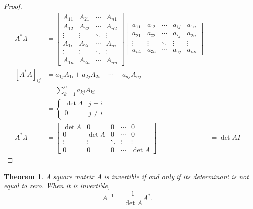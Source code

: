 \documentclass{article}
\newtheorem{theorem}{Theorem}[section]
\theoremstyle{definition}
\begin{document}
\begin{proof}
    \begin{align*}
        A^{*}A
        &=
        \begin{bmatrix}
            A_{11} & A_{21} & \cdots & A_{n1}\\
            A_{12} & A_{22} & \cdots & A_{n2}\\
            \vdots & \vdots & \ddots & \vdots\\
            A_{1i} & A_{2i} & \cdots & A_{ni}\\
            \vdots & \vdots & \ddots & \vdots\\
            A_{1n} & A_{2n} & \cdots & A_{nn}
        \end{bmatrix}
        \begin{bmatrix}
            a_{11}&a_{12} & \cdots & a_{1j} & a_{1n}\\
            a_{21} & a_{22} & \cdots & a_{2j} & a_{2n}\\
            \vdots & \vdots & \ddots & \vdots & \vdots\\
            a_{n1} & a_{2n} & \cdots & a_{nj} & a_{nn}
        \end{bmatrix}\\
        [A^{*}A]_{ij}&=
        a_{1j}A_{1i}+a_{2j}A_{2i}+\cdots+a_{nj}A_{nj}\\
        &=\sum_{k=1}^{n}a_{kj}A_{ki}\\
        &=\begin{cases}
            \det{A} & j=i\\
            0 & j\neq i
        \end{cases}\\
        A^{*}A&=
        \begin{bmatrix}
            \det{A} & 0 & 0 & \cdots & 0\\
            0 & \det{A} & 0 & \cdots & 0\\
            \vdots & \vdots & \ddots & \vdots & \vdots\\
            0 & 0 & 0 & \cdots & \det{A}
        \end{bmatrix}
        &=
        \det A I
    \end{align*}
\end{proof} 

\begin{theorem}
    A square matrix $A$ is invertible if and 
    only if its determinant is not equal to zero.
    When it is invertible,
    $$A^{-1}=\frac{1}{\det A}A^{*}.$$
\end{theorem}
\end{document}
